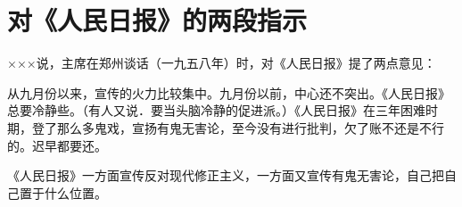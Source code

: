 \section[对《人民日报》的两段指示（一九五八年十一月）]{对《人民日报》的两段指示}


×××说，主席在郑州谈话（一九五八年）时，对《人民日报》提了两点意见：

从九月份以来，宣传的火力比较集中。九月份以前，中心还不突出。《人民日报》总要冷静些。（有人又说．要当头脑冷静的促进派。）《人民日报》在三年困难时期，登了那么多鬼戏，宣扬有鬼无害论，至今没有进行批判，欠了账不还是不行的。迟早都要还。

《人民日报》一方面宣传反对现代修正主义，一方面又宣传有鬼无害论，自己把自己置于什么位置。


